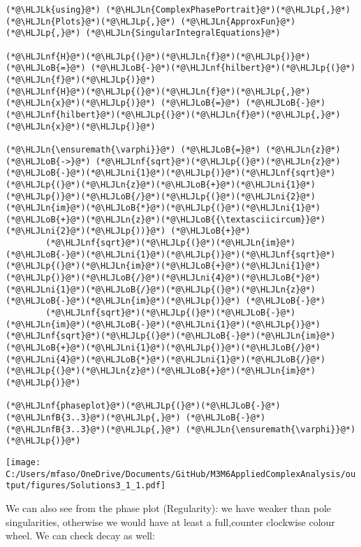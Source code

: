 \documentclass[12pt,a4paper]{article}
\newcommand{\HLJLk}[1]{\textcolor[RGB]{148,91,176}{\textbf{#1}}}
\newcommand{\HLJLn}[1]{#1}
\newcommand{\HLJLnf}[1]{\textcolor[RGB]{66,102,213}{#1}}
\newcommand{\HLJLnfB}[1]{\textcolor[RGB]{59,151,46}{#1}}
\newcommand{\HLJLni}[1]{\textcolor[RGB]{59,151,46}{#1}}
\newcommand{\HLJLoB}[1]{\textcolor[RGB]{102,102,102}{\textbf{#1}}}
\newcommand{\HLJLp}[1]{#1}
\begin{document}
\begin{lstlisting}
(*@\HLJLk{using}@*) (*@\HLJLn{ComplexPhasePortrait}@*)(*@\HLJLp{,}@*) (*@\HLJLn{Plots}@*)(*@\HLJLp{,}@*) (*@\HLJLn{ApproxFun}@*)(*@\HLJLp{,}@*) (*@\HLJLn{SingularIntegralEquations}@*)

(*@\HLJLnf{H}@*)(*@\HLJLp{(}@*)(*@\HLJLn{f}@*)(*@\HLJLp{)}@*) (*@\HLJLoB{=}@*) (*@\HLJLoB{-}@*)(*@\HLJLnf{hilbert}@*)(*@\HLJLp{(}@*)(*@\HLJLn{f}@*)(*@\HLJLp{)}@*)
(*@\HLJLnf{H}@*)(*@\HLJLp{(}@*)(*@\HLJLn{f}@*)(*@\HLJLp{,}@*)(*@\HLJLn{x}@*)(*@\HLJLp{)}@*) (*@\HLJLoB{=}@*) (*@\HLJLoB{-}@*)(*@\HLJLnf{hilbert}@*)(*@\HLJLp{(}@*)(*@\HLJLn{f}@*)(*@\HLJLp{,}@*)(*@\HLJLn{x}@*)(*@\HLJLp{)}@*)

(*@\HLJLn{\ensuremath{\varphi}}@*) (*@\HLJLoB{=}@*) (*@\HLJLn{z}@*) (*@\HLJLoB{->}@*) (*@\HLJLnf{sqrt}@*)(*@\HLJLp{(}@*)(*@\HLJLn{z}@*)(*@\HLJLoB{-}@*)(*@\HLJLni{1}@*)(*@\HLJLp{)}@*)(*@\HLJLnf{sqrt}@*)(*@\HLJLp{(}@*)(*@\HLJLn{z}@*)(*@\HLJLoB{+}@*)(*@\HLJLni{1}@*)(*@\HLJLp{)}@*)(*@\HLJLoB{/}@*)(*@\HLJLp{(}@*)(*@\HLJLni{2}@*)(*@\HLJLn{im}@*)(*@\HLJLoB{*}@*)(*@\HLJLp{(}@*)(*@\HLJLni{1}@*)(*@\HLJLoB{+}@*)(*@\HLJLn{z}@*)(*@\HLJLoB{{\textasciicircum}}@*)(*@\HLJLni{2}@*)(*@\HLJLp{))}@*) (*@\HLJLoB{+}@*)
        (*@\HLJLnf{sqrt}@*)(*@\HLJLp{(}@*)(*@\HLJLn{im}@*)(*@\HLJLoB{-}@*)(*@\HLJLni{1}@*)(*@\HLJLp{)}@*)(*@\HLJLnf{sqrt}@*)(*@\HLJLp{(}@*)(*@\HLJLn{im}@*)(*@\HLJLoB{+}@*)(*@\HLJLni{1}@*)(*@\HLJLp{)}@*)(*@\HLJLoB{/}@*)(*@\HLJLni{4}@*)(*@\HLJLoB{*}@*)(*@\HLJLni{1}@*)(*@\HLJLoB{/}@*)(*@\HLJLp{(}@*)(*@\HLJLn{z}@*)(*@\HLJLoB{-}@*)(*@\HLJLn{im}@*)(*@\HLJLp{)}@*) (*@\HLJLoB{-}@*)
        (*@\HLJLnf{sqrt}@*)(*@\HLJLp{(}@*)(*@\HLJLoB{-}@*)(*@\HLJLn{im}@*)(*@\HLJLoB{-}@*)(*@\HLJLni{1}@*)(*@\HLJLp{)}@*)(*@\HLJLnf{sqrt}@*)(*@\HLJLp{(}@*)(*@\HLJLoB{-}@*)(*@\HLJLn{im}@*)(*@\HLJLoB{+}@*)(*@\HLJLni{1}@*)(*@\HLJLp{)}@*)(*@\HLJLoB{/}@*)(*@\HLJLni{4}@*)(*@\HLJLoB{*}@*)(*@\HLJLni{1}@*)(*@\HLJLoB{/}@*)(*@\HLJLp{(}@*)(*@\HLJLn{z}@*)(*@\HLJLoB{+}@*)(*@\HLJLn{im}@*)(*@\HLJLp{)}@*)

(*@\HLJLnf{phaseplot}@*)(*@\HLJLp{(}@*)(*@\HLJLoB{-}@*)(*@\HLJLnfB{3..3}@*)(*@\HLJLp{,}@*) (*@\HLJLoB{-}@*)(*@\HLJLnfB{3..3}@*)(*@\HLJLp{,}@*) (*@\HLJLn{\ensuremath{\varphi}}@*)(*@\HLJLp{)}@*)
\end{lstlisting}

\texttt{[image: C:/Users/mfaso/OneDrive/Documents/GitHub/M3M6AppliedComplexAnalysis/output/figures/Solutions3\_1\_1.pdf]}

We can also see from the phase plot (Regularity): we have weaker than pole singularities, otherwise we would have at least a full,counter clockwise colour wheel. We can check decay as well:
\end{document}
